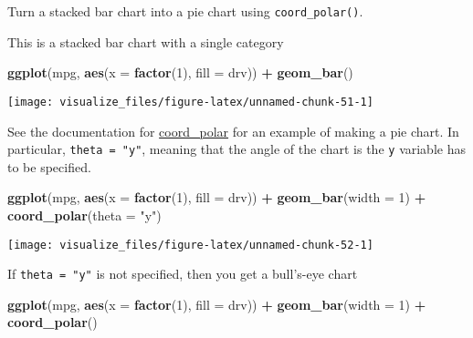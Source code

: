 \documentclass[]{book}
\newenvironment{Shaded}{\begin{snugshade}}{\end{snugshade}}
\newcommand{\DataTypeTok}[1]{\textcolor[rgb]{0.13,0.29,0.53}{#1}}
\newcommand{\DecValTok}[1]{\textcolor[rgb]{0.00,0.00,0.81}{#1}}
\newcommand{\KeywordTok}[1]{\textcolor[rgb]{0.13,0.29,0.53}{\textbf{#1}}}
\newcommand{\NormalTok}[1]{#1}
\newcommand{\OperatorTok}[1]{\textcolor[rgb]{0.81,0.36,0.00}{\textbf{#1}}}
\newcommand{\StringTok}[1]{\textcolor[rgb]{0.31,0.60,0.02}{#1}}
\theoremstyle{plain}
\theoremstyle{remark}
\theoremstyle{definition}
\theoremstyle{definition}
\theoremstyle{definition}
\theoremstyle{remark}
\begin{document}
Turn a stacked bar chart into a pie chart using \texttt{coord\_polar()}.

This is a stacked bar chart with a single category

\begin{Shaded}
\begin{Highlighting}[]
\KeywordTok{ggplot}\NormalTok{(mpg, }\KeywordTok{aes}\NormalTok{(}\DataTypeTok{x =} \KeywordTok{factor}\NormalTok{(}\DecValTok{1}\NormalTok{), }\DataTypeTok{fill =}\NormalTok{ drv)) }\OperatorTok{+}
\StringTok{  }\KeywordTok{geom_bar}\NormalTok{()}
\end{Highlighting}
\end{Shaded}

\begin{center}\texttt{[image: visualize\_files/figure-latex/unnamed-chunk-51-1]} \end{center}

See the documentation for
\href{http://docs.ggplot2.org/current/coord_polar.html}{coord\_polar}
for an example of making a pie chart. In particular,
\texttt{theta\ =\ "y"}, meaning that the angle of the chart is the
\texttt{y} variable has to be specified.

\begin{Shaded}
\begin{Highlighting}[]
\KeywordTok{ggplot}\NormalTok{(mpg, }\KeywordTok{aes}\NormalTok{(}\DataTypeTok{x =} \KeywordTok{factor}\NormalTok{(}\DecValTok{1}\NormalTok{), }\DataTypeTok{fill =}\NormalTok{ drv)) }\OperatorTok{+}
\StringTok{  }\KeywordTok{geom_bar}\NormalTok{(}\DataTypeTok{width =} \DecValTok{1}\NormalTok{) }\OperatorTok{+}
\StringTok{  }\KeywordTok{coord_polar}\NormalTok{(}\DataTypeTok{theta =} \StringTok{"y"}\NormalTok{)}
\end{Highlighting}
\end{Shaded}

\begin{center}\texttt{[image: visualize\_files/figure-latex/unnamed-chunk-52-1]} \end{center}

If \texttt{theta\ =\ "y"} is not specified, then you get a bull's-eye
chart

\begin{Shaded}
\begin{Highlighting}[]
\KeywordTok{ggplot}\NormalTok{(mpg, }\KeywordTok{aes}\NormalTok{(}\DataTypeTok{x =} \KeywordTok{factor}\NormalTok{(}\DecValTok{1}\NormalTok{), }\DataTypeTok{fill =}\NormalTok{ drv)) }\OperatorTok{+}
\StringTok{  }\KeywordTok{geom_bar}\NormalTok{(}\DataTypeTok{width =} \DecValTok{1}\NormalTok{) }\OperatorTok{+}
\StringTok{  }\KeywordTok{coord_polar}\NormalTok{()}
\end{Highlighting}
\end{Shaded}
\end{document}
